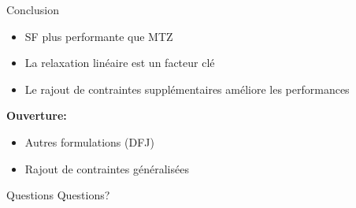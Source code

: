 \documentclass{beamer}
\begin{document}
\begin{frame}{Conclusion}
\begin{itemize}
    \item SF plus performante que MTZ
    \item La relaxation linéaire est un facteur clé
    \item Le rajout de contraintes supplémentaires améliore les performances
\end{itemize}

\bigskip

\textbf{Ouverture:}
\begin{itemize}
    \item Autres formulations (DFJ)
    \item Rajout de contraintes généralisées
\end{itemize}
\end{frame}

\begin{frame}{Questions}
\centering
\Huge Questions?
\end{frame}
\end{document}
